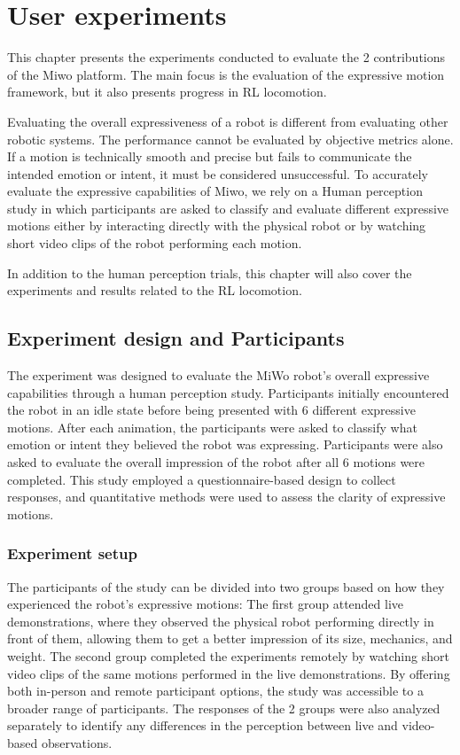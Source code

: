 
\chapter{User experiments}
This chapter presents the experiments conducted to evaluate the 2 contributions of the Miwo platform. The main focus is the evaluation of the expressive motion framework, but it also presents progress in RL locomotion. 

Evaluating the overall expressiveness of a robot is different from evaluating other robotic systems. The performance cannot be evaluated by objective metrics alone. If a motion is technically smooth and precise but fails to communicate the intended emotion or intent, it must be considered unsuccessful. To accurately evaluate the expressive capabilities of Miwo, we rely on a Human perception study in which participants are asked to classify and evaluate different expressive motions either by interacting directly with the physical robot or by watching short video clips of the robot performing each motion. 

In addition to the human perception trials, this chapter will also cover the experiments and results related to the RL locomotion. 


\section{Experiment design and Participants}
The experiment was designed to evaluate the MiWo robot's overall expressive capabilities through a human perception study. Participants initially encountered the robot in an idle state before being presented with 6 different expressive motions. After each animation, the participants were asked to classify what emotion or intent they believed the robot was expressing. Participants were also asked to evaluate the overall impression of the robot after all 6 motions were completed. This study employed a questionnaire-based design to collect responses, and quantitative methods were used to assess the clarity of expressive motions.

\subsection{Experiment setup}               
The participants of the study can be divided into two groups based on how they experienced the robot's expressive motions: 
The first group attended live demonstrations, where they observed the physical robot performing directly in front of them, allowing them to get a better impression of its size, mechanics, and weight. 
The second group completed the experiments remotely by watching short video clips of the same motions performed in the live demonstrations. 
By offering both in-person and remote participant options, the study was accessible to a broader range of participants. The responses of the 2 groups were also analyzed separately to identify any differences in the perception between live and video-based observations.
                

